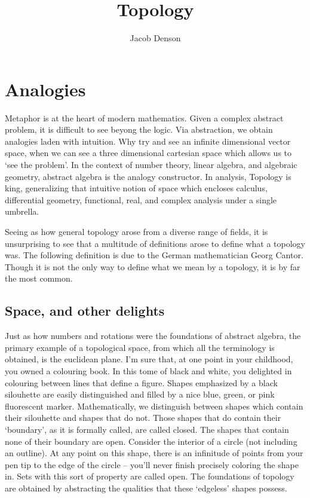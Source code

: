 

\DeclareMathOperator{\Dom}{Dom}

\title{Topology}
\author{Jacob Denson}




\maketitle

\tableofcontents


\chapter{Analogies}

Metaphor is at the heart of modern mathematics. Given a complex abstract problem, it is difficult to see beyong the logic. Via abstraction, we obtain analogies laden with intuition. Why try and see an infinite dimensional vector space, when we can see a three dimensional cartesian space which allows us to `see the problem'. In the context of number theory, linear algebra, and algebraic geometry, abstract algebra is the analogy constructor. In analysis, Topology is king, generalizing that intuitive notion of space which encloses calculus, differential geometry, functional, real, and complex analysis under a single umbrella.

Seeing as how general topology arose from a diverse range of fields, it is unsurprising to see that a multitude of definitions arose to define what a topology was. The following definition is due to the German mathematician Georg Cantor. Though it is not the only way to define what we mean by a topology, it is by far the most common.

\section{Space, and other delights}

Just as how numbers and rotations were the foundations of abstract algebra, the primary example of a topological space, from which all the terminology is obtained, is the euclidean plane. I'm sure that, at one point in your childhood, you owned a colouring book. In this tome of black and white, you delighted in colouring between lines that define a figure. Shapes emphasized by a black silouhette are easily distinguished and filled by a nice blue, green, or pink fluorescent marker. Mathematically, we distinguish between shapes which contain their silouhette and shapes that do not. Those shapes that do contain their `boundary', as it is formally called, are called closed. The shapes that contain none of their boundary are open. Consider the interior of a circle (not including an outline). At any point on this shape, there is an infinitude of points from your pen tip to the edge of the circle -- you'll never finish precisely coloring the shape in. Sets with this sort of property are called open. The foundations of topology are obtained by abstracting the qualities that these `edgeless' shapes possess.

